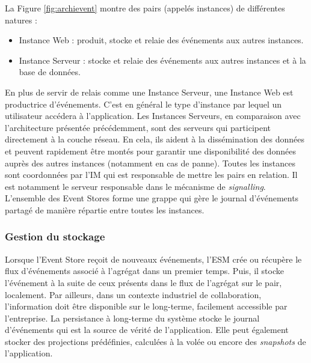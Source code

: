 La Figure \ref{fig:archievent} montre des pairs (appelés instances) de différentes 
natures :
\begin{itemize}
	\item Instance Web :  produit, stocke et relaie des événements aux autres 
	instances.
	\item Instance Serveur : stocke et relaie des événements aux autres instances 
	et à la base de données. 
\end{itemize}

En plus de servir de relais comme une Instance Serveur, une Instance Web est 
productrice d'événements. C'est en général le type d'instance par lequel un 
utilisateur accédera à l'application. Les Instances Serveurs, en comparaison avec 
l'architecture présentée précédemment, sont des \og serveurs\fg{} qui participent 
directement à la couche réseau. En cela, ils aident à la dissémination des données 
et peuvent rapidement être montés pour garantir une disponibilité des données 
auprès des autres instances (notamment en cas de panne).
Toutes les instances sont coordonnées par l'\gls{IM} qui est responsable de mettre 
les pairs en relation. Il est notamment le serveur responsable dans le mécanisme 
de \textit{signalling}. 
L'ensemble des Event Stores forme une grappe qui gère le 
journal d'événements partagé de manière répartie entre toutes les instances.
\subsubsection{Gestion du stockage}

Lorsque l'Event Store reçoit de nouveaux événements, l'\gls{ESM} crée ou 
récupère le flux d'événements associé à l'agrégat dans un premier temps. Puis, il 
stocke l'événement à la suite de ceux présents dans le flux de l'agrégat sur le pair, 
localement.
Par ailleurs, dans un contexte industriel de collaboration, l'information doit être 
disponible sur le long-terme, facilement accessible par l'entreprise. 
La persistance à long-terme du système stocke le journal d'événements qui est la 
source de vérité de l'application. Elle peut également stocker des projections 
prédéfinies, calculées à la volée ou encore des \textit{snapshots} de l'application.

